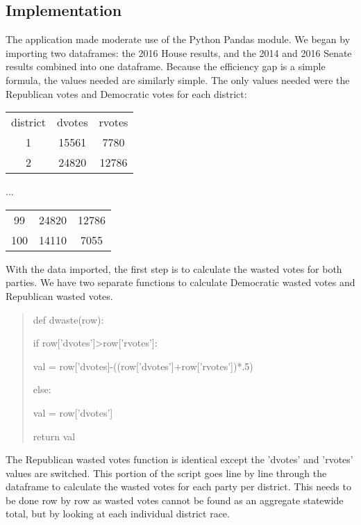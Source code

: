 \documentclass[sigconf]{acmart}
\begin{document}
\subsection{Implementation}

The application made moderate use of the Python Pandas module. We began by importing two dataframes: the 2016 House results, and the 2014 and 2016 Senate results combined into one dataframe. Because the efficiency gap is a simple formula, the values needed are similarly simple. The only values needed were the Republican votes and Democratic votes for each district:

\begin{center}
\begin{tabular}{ |c|c|c| }
    district & dvotes & rvotes \\
    1 & 15561 & 7780 \\
    2 & 24820 & 12786 \\
\end{tabular}
\end{center}
\begin{center}
...
\end{center}
\begin{center}
\begin{tabular}{ |c|c|c| }
    99 & 24820 & 12786 \\
    100 & 14110 & 7055 \\
\end{tabular}
\end{center}

With the data imported, the first step is to calculate the wasted votes for both parties. We have two separate functions to calculate Democratic wasted votes and Republican wasted votes.
\begin{quote}
def dwaste(row):
    
\indent if row['dvotes']\textgreater row['rvotes']:
    
\indent \indent val = row['dvotes]-((row['dvotes']+row['rvotes'])*.5)
    
\indent else:
    
\indent \indent val = row['dvotes']
    
\indent return val
\end{quote}

The Republican wasted votes function is identical except the 'dvotes' and 'rvotes' values are switched. This portion of the script goes line by line through the dataframe to calculate the wasted votes for each party per district. This needs to be done row by row as wasted votes cannot be found as an aggregate statewide total, but by looking at each individual district race. 
\end{document}

